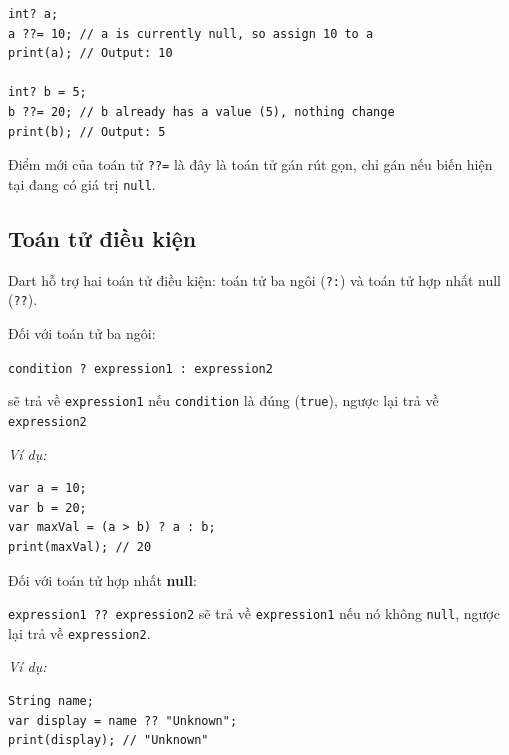 \documentclass[../DoAn.tex]{subfiles}
\numberwithin{figure}{chapter}
\begin{document}
\begin{lstlisting}
int? a;
a ??= 10; // a is currently null, so assign 10 to a
print(a); // Output: 10

int? b = 5;
b ??= 20; // b already has a value (5), nothing change
print(b); // Output: 5
\end{lstlisting}

Điểm mới của toán tử \texttt{??=} là đây là toán tử gán rút gọn, chỉ gán nếu biến hiện tại đang có giá trị \texttt{null}.

\subsection{Toán tử điều kiện}
Dart hỗ trợ hai toán tử điều kiện: toán tử ba ngôi (\texttt{?:}) và toán tử hợp nhất null (\texttt{??}). 

Đối với toán tử ba ngôi:  

\texttt{condition ? expression1 : expression2} 

sẽ trả về \texttt{expression1} nếu \texttt{condition} là đúng (\texttt{true}), ngược lại trả về \texttt{expression2} 

\textit{Ví dụ:} 
\begin{lstlisting}
var a = 10; 
var b = 20; 
var maxVal = (a > b) ? a : b;
print(maxVal); // 20    
\end{lstlisting}

Đối với toán tử hợp nhất \textbf{null}: 

\texttt{expression1 ?? expression2} sẽ trả về \texttt{expression1} nếu nó không \texttt{null}, ngược lại trả về \texttt{expression2}. 

\textit{Ví dụ:}
\begin{lstlisting}
String name;
var display = name ?? "Unknown";
print(display); // "Unknown"
\end{lstlisting}
\end{document}
